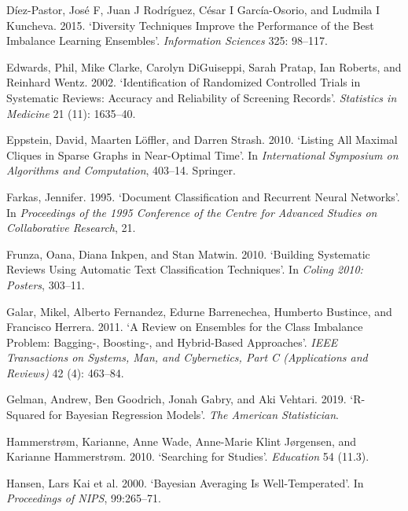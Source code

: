 \documentclass{article}
\newlength{\cslhangindent}
\newlength{\cslentryspacingunit} %
\newenvironment{CSLReferences}[2] %
 {%
  \setlength{\parindent}{0pt}
  \ifodd #1
  \let\oldpar\par
  \def\par{\hangindent=\cslhangindent\oldpar}
  \fi
  \setlength{\parskip}{#2\cslentryspacingunit}
 }%
 {}
\begin{document}
\begin{CSLReferences}{1}{0}
\leavevmode{}%
Díez-Pastor, José F, Juan J Rodríguez, César I García-Osorio, and
Ludmila I Kuncheva. 2015. {`Diversity Techniques Improve the Performance
of the Best Imbalance Learning Ensembles'}. \emph{Information Sciences}
325: 98--117.

\leavevmode{}%
Edwards, Phil, Mike Clarke, Carolyn DiGuiseppi, Sarah Pratap, Ian
Roberts, and Reinhard Wentz. 2002. {`Identification of Randomized
Controlled Trials in Systematic Reviews: Accuracy and Reliability of
Screening Records'}. \emph{Statistics in Medicine} 21 (11): 1635--40.

\leavevmode{}%
Eppstein, David, Maarten Löffler, and Darren Strash. 2010. {`Listing All
Maximal Cliques in Sparse Graphs in Near-Optimal Time'}. In
\emph{International Symposium on Algorithms and Computation}, 403--14.
Springer.

\leavevmode{}%
Farkas, Jennifer. 1995. {`Document Classification and Recurrent Neural
Networks'}. In \emph{Proceedings of the 1995 Conference of the Centre
for Advanced Studies on Collaborative Research}, 21.

\leavevmode{}%
Frunza, Oana, Diana Inkpen, and Stan Matwin. 2010. {`Building Systematic
Reviews Using Automatic Text Classification Techniques'}. In
\emph{Coling 2010: Posters}, 303--11.

\leavevmode{}%
Galar, Mikel, Alberto Fernandez, Edurne Barrenechea, Humberto Bustince,
and Francisco Herrera. 2011. {`A Review on Ensembles for the Class
Imbalance Problem: Bagging-, Boosting-, and Hybrid-Based Approaches'}.
\emph{IEEE Transactions on Systems, Man, and Cybernetics, Part C
(Applications and Reviews)} 42 (4): 463--84.

\leavevmode{}%
Gelman, Andrew, Ben Goodrich, Jonah Gabry, and Aki Vehtari. 2019.
{`R-Squared for Bayesian Regression Models'}. \emph{The American
Statistician}.

\leavevmode{}%
Hammerstrøm, Karianne, Anne Wade, Anne-Marie Klint Jørgensen, and
Karianne Hammerstrøm. 2010. {`Searching for Studies'}. \emph{Education}
54 (11.3).

\leavevmode{}%
Hansen, Lars Kai et al. 2000. {`Bayesian Averaging Is Well-Temperated'}.
In \emph{Proceedings of NIPS}, 99:265--71.


\end{CSLReferences}
\end{document}
